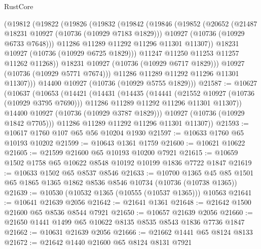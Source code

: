 \begin{lexlean}{RustCore}
\begin{coremodule}
            (@19812
              (@19822
                (@19826
                  (@19832
                    (@19842
                      (@19846
                        (@19852
                          (@20652
                            (@21487 @18231 @10927 (@10736 (@10929 @7183 @1829)))
                            @10927
                            (@10736 (@10929 @6733 @7648)))
                          @11286
                          @11289
                          @11292
                          @11296
                          @11301
                          @11307))
                      @18231
                      @10927
                      (@10736 (@10929 @6725 @1829)))
                    @11247
                    @11250
                    @11253
                    @11257
                    @11262
                    @11268))
                @18231
                @10927
                (@10736 (@10929 @6717 @1829)))
              @10927
              (@10736 (@10929 @5771 @7674)))
            @11286
            @11289
            @11292
            @11296
            @11301
            @11307)))
      @14400
      @10927
      (@10736 (@10929 @5755 @1829)))
@21587 := @10627
    (@10637
      (@10653
        (@14421
          (@14431
            (@14435
              (@14441
                (@21552 @10927 (@10736 (@10929 @3795 @7690)))
                @11286
                @11289
                @11292
                @11296
                @11301
                @11307))
            @14400
            @10927
            (@10736 (@10929 @3787 @1829)))
          @10927
          (@10736 (@10929 @1842 @7705)))
        @11286
        @11289
        @11292
        @11296
        @11301
        @11307))
@21593 := @10617 @1760 @107 @65 @56 @10204 @1930
@21597 := @10633 @1760 @65 @10193 @10202
@21599 := @10643 @1361 @1759
@21600 := @10621 @10622
@21605 := @21599 @21600 @65 @10193 @10200 @7921
@21615 := @10659 @1502 @1758 @65 @10622 @8548 @10192 @10199 @1836 @7722 @1847
@21619 := @10633 @1502 @65 @8537 @8546
@21633 := @10700
    @1365
    @45
    @85
    @1501
    @65
    @1865
    @1365
    @1862
    @8536
    @8546
    @10734
    (@10736 (@10738 @1365))
@21639 := @10530 (@10532 @1365 (@10555 (@10537 @1365))) @10563
@21641 := @10641 @21639 @2056
@21642 := @21641 @1361
@21648 := @21642 @1500 @21600 @65 @8536 @8544 @7921
@21650 := @10657 @21639 @2056
@21660 := @21650 @1441 @1499 @65 @10622 @8135 @8535 @8543 @1836 @7736 @1847
@21662 := @10631 @21639 @2056
@21666 := @21662 @1441 @65 @8124 @8133
@21672 := @21642 @1440 @21600 @65 @8124 @8131 @7921

\end{coremodule}
\end{lexlean}
